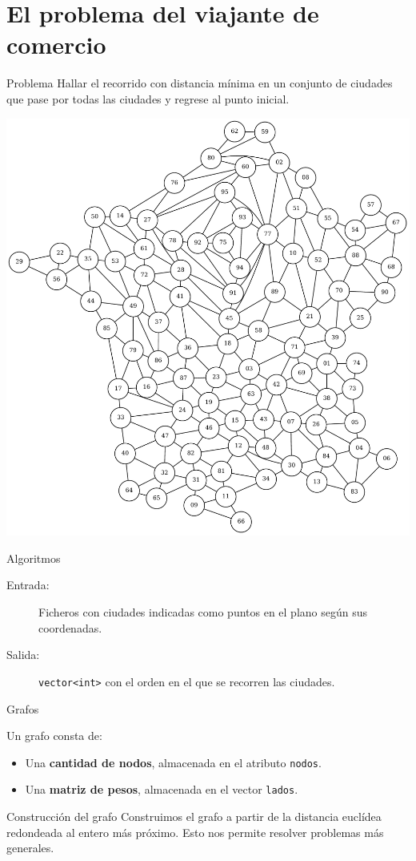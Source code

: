\section{El problema del viajante de comercio}

\begin{frame}{Problema}
Hallar el recorrido con distancia mínima en un conjunto de
ciudades que pase por todas las ciudades y regrese al punto inicial.

\includegraphics[width=.5\textwidth]{img/Francia} \centering
\end{frame}

\begin{frame}{Algoritmos}
\begin{description}
 \item[Entrada:] Ficheros con ciudades indicadas como puntos en el plano según sus
 coordenadas.
 \item[Salida:] \texttt{vector<int>} con el orden en el que se recorren las ciudades.
\end{description}
\end{frame}

\begin{frame}{Grafos}

Un grafo consta de:

\begin{itemize}
  \item Una \textbf{cantidad de nodos}, almacenada en el atributo \texttt{nodos}.
  \item Una \textbf{matriz de pesos}, almacenada en el vector \texttt{lados}.
\end{itemize}

\end{frame}

\begin{frame}[fragile]{Construcción del grafo}
Construimos el grafo a partir de la distancia euclídea redondeada al entero más próximo.
Esto nos permite resolver problemas más generales.

\end{frame}

